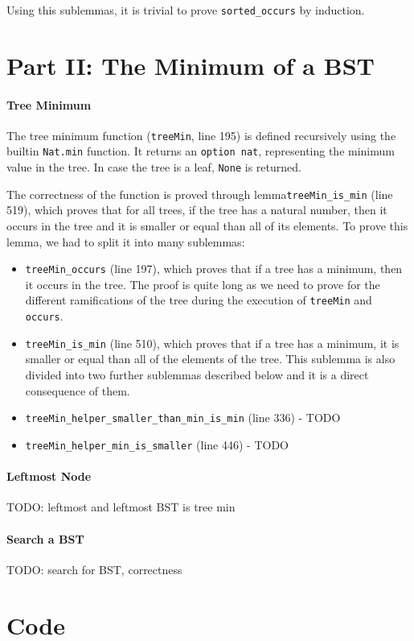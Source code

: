 \documentclass[a4paper]{article}
\begin{document}
Using this sublemmas, it is trivial to prove \texttt{sorted\_occurs} by induction.

\section{Part II: The Minimum of a BST}

\paragraph{Tree Minimum} The tree minimum function (\texttt{treeMin}, line 195) is defined recursively using the builtin \texttt{Nat.min} function. It returns an \texttt{option nat}, representing the minimum value in the tree. In case the tree is a leaf, \texttt{None} is returned.

The correctness of the function is proved through lemma\texttt{treeMin\_is\_min} (line 519), which proves that for all trees, if the tree has a natural number, then it occurs in the tree and it is smaller or equal than all of its elements. To prove this lemma, we had to split it into many sublemmas:

\begin{itemize}
    \item \texttt{treeMin\_occurs} (line 197), which proves that if a tree has a minimum, then it occurs in the tree. The proof is quite long as we need to prove for the different ramifications of the tree during the execution of \texttt{treeMin} and \texttt{occurs}.
    \item \texttt{treeMin\_is\_min} (line 510), which proves that if a tree has a minimum, it is smaller or equal than all of the elements of the tree. This sublemma is also divided into two further sublemmas described below and it is a direct consequence of them.
    \item \texttt{treeMin\_helper\_smaller\_than\_min\_is\_min} (line 336) - TODO
    \item \texttt{treeMin\_helper\_min\_is\_smaller} (line 446) - TODO
\end{itemize}
 
\paragraph{Leftmost Node}

TODO: leftmost and leftmost BST is tree min

\paragraph{Search a BST}

TODO: search for BST, correctness

\appendix

\section{Code}


\end{document}
